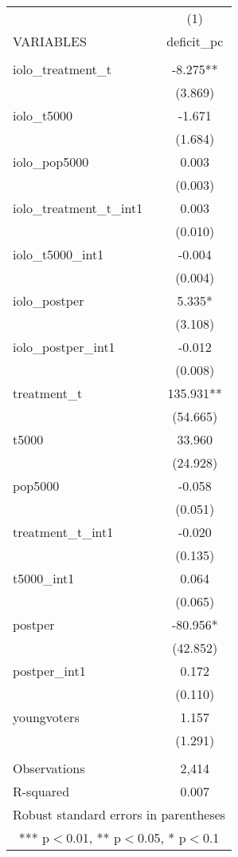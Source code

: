 \documentclass[]{article}
\begin{document}
\begin{tabular}{lc} \hline
 & (1) \\
VARIABLES & deficit\_pc \\ \hline
 &  \\
iolo\_treatment\_t & -8.275** \\
 & (3.869) \\
iolo\_t5000 & -1.671 \\
 & (1.684) \\
iolo\_pop5000 & 0.003 \\
 & (0.003) \\
iolo\_treatment\_t\_int1 & 0.003 \\
 & (0.010) \\
iolo\_t5000\_int1 & -0.004 \\
 & (0.004) \\
iolo\_postper & 5.335* \\
 & (3.108) \\
iolo\_postper\_int1 & -0.012 \\
 & (0.008) \\
treatment\_t & 135.931** \\
 & (54.665) \\
t5000 & 33.960 \\
 & (24.928) \\
pop5000 & -0.058 \\
 & (0.051) \\
treatment\_t\_int1 & -0.020 \\
 & (0.135) \\
t5000\_int1 & 0.064 \\
 & (0.065) \\
postper & -80.956* \\
 & (42.852) \\
postper\_int1 & 0.172 \\
 & (0.110) \\
youngvoters & 1.157 \\
 & (1.291) \\
 &  \\
Observations & 2,414 \\
 R-squared & 0.007 \\ \hline
\multicolumn{2}{c}{ Robust standard errors in parentheses} \\
\multicolumn{2}{c}{ *** p$<$0.01, ** p$<$0.05, * p$<$0.1} \\
\end{tabular}
\end{document}
